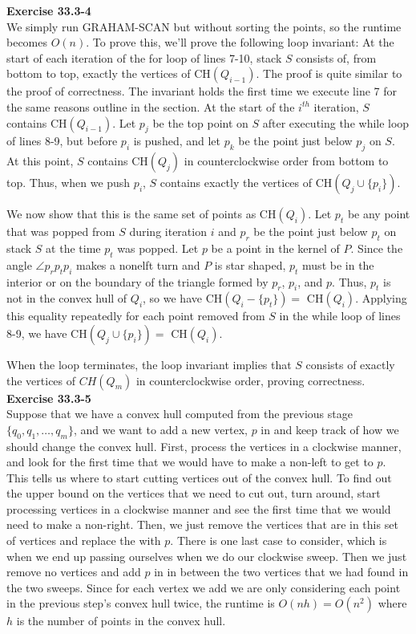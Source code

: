 \documentclass{article}
\begin{document}
\noindent\textbf{Exercise 33.3-4}\\

We simply run GRAHAM-SCAN but without sorting the points, so the runtime becomes $O(n)$.  To prove this, we'll prove the following loop invariant: At the start of each iteration of the for loop of lines 7-10, stack $S$ consists of, from bottom to top, exactly the vertices of CH$(Q_{i-1})$.  The proof is quite similar to the proof of correctness.  The invariant holds the first time we execute line 7 for the same reasons outline in the section.  At the start of the $i^{th}$ iteration, $S$ contains CH$(Q_{i-1})$.  Let $p_j$ be the top point on $S$ after executing the while loop of lines 8-9, but before $p_i$ is pushed, and let $p_k$ be the point just below $p_j$ on $S$.  At this point, $S$ contains CH$(Q_j)$ in counterclockwise order from bottom to top. Thus, when we push $p_i$, $S$ contains exactly the vertices of CH$(Q_j \cup \{p_i\})$.  

We now show that this is the same set of points as CH$(Q_i)$.  Let $p_t$ be any point that was popped from $S$ during iteration $i$ and $p_r$ be the point just below $p_t$ on stack $S$ at the time $p_t$ was popped.  Let $p$ be a point in the kernel of $P$. Since the angle $\angle p_rp_tp_i$ makes a nonelft turn and $P$ is star shaped, $p_t$ must be in the interior or on the boundary of the triangle formed by $p_r$, $p_i$, and $p$.  Thus, $p_t$ is not in the convex hull of $Q_i$, so we have CH$(Q_i - \{p_t\}) = $ CH$(Q_i)$.  Applying this equality repeatedly for each point removed from $S$ in the while loop of lines 8-9, we have CH$(Q_j \cup \{p_i\}) = $ CH$(Q_i)$.

When the loop terminates, the loop invariant implies that $S$ consists of exactly the vertices of $CH(Q_m)$ in counterclockwise order, proving correctness. \\

\noindent\textbf{Exercise 33.3-5}\\

Suppose that we have a convex hull computed from the previous stage $\{q_0,q_1,\ldots, q_m\}$, and we want to add a new vertex, $p$  in and keep track of how we should change the convex hull. First, process the vertices in a clockwise manner, and look for the first time that we would have to make a non-left to get to $p$. This tells us where to start cutting vertices out of the convex hull. To find out the upper bound on the vertices that we need to cut out, turn around, start processing vertices in a clockwise manner and see the first time that we would need to make a non-right. Then, we just remove the vertices that are in this set of vertices and replace the with $p$. There is one last case to consider, which is when we end up passing ourselves when we do our clockwise sweep. Then we just remove no vertices and add $p$ in in between the two vertices that we had found in the two sweeps. Since for each vertex we add we are only considering each point in the previous step's convex hull twice, the runtime is $O(nh) = O(n^2)$ where $h$ is the number of points in the convex hull.\\
\end{document}
